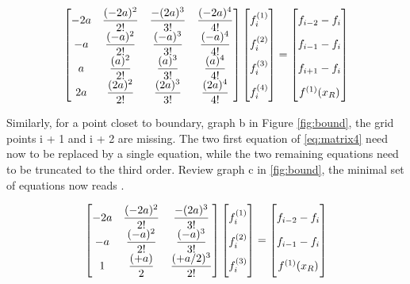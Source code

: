 \begin{align}
\begin{bmatrix} \label{eq:matrix4}
    -2a & \dfrac{(-2a)^2}{2!} & \dfrac{-(2a)^3}{3!} & \dfrac{(-2a)^4}{4!}\\
    -a & \dfrac{(-a)^2}{2!} & \dfrac{(-a)^3}{3!} & \dfrac{(-a)^4}{4!}\\
    a & \dfrac{(a)^2}{2!} & \dfrac{(a)^3}{3!} & \dfrac{(a)^4}{4!}\\
    2a & \dfrac{(2a)^2}{2!} & \dfrac{(2a)^3}{3!} & \dfrac{(2a)^4}{4!}
\end{bmatrix}
\begin{bmatrix}
    f_i^{(1)}  \vphantom{ \dfrac{d^4}{d} }\\
    f_i^{(2)}  \vphantom{ \dfrac{d^4}{d} } \\
    f_i^{(3)}  \vphantom{ \dfrac{d^4}{d} } \\
    f_i^{(4)}  \vphantom{ \dfrac{d^4}{d} }
\end{bmatrix}
=
\begin{bmatrix}
    f_{i-2} - f_{i}    \vphantom{ \dfrac{d^4}{d}} \\
    f_{i-1} - f_{i}    \vphantom{ \dfrac{d^4}{d}} \\
    f_{i+1} - f_{i}    \vphantom{ \dfrac{d^4}{d}} \\
    f^{(1)}(x_R)   \vphantom{ \dfrac{d^4}{d}}
\end{bmatrix}
\end{align}

Similarly, for a point closet to boundary, graph b in Figure \ref{fig:bound}, the grid points i + 1 and i + 2 are missing. The two first equation of \ref{eq:matrix4} need now to be replaced by a single equation, while the two remaining equations need to be truncated to the third order. Review graph c in \ref{fig:bound}, the minimal set of equations now reads \cite{methods}.

\begin{align} \label{eq:matrix3}
\begin{bmatrix}
    -2a & \dfrac{(-2a)^2}{2!} & \dfrac{-(2a)^3}{3!}\\
    -a & \dfrac{(-a)^2}{2!} & \dfrac{(-a)^3}{3!}\\
    1 & \dfrac{(+a)}{2} & \dfrac{(+a/2)^3}{2!}
\end{bmatrix}
\begin{bmatrix}
    f_i^{(1)}  \vphantom{ \dfrac{d^4}{d} }\\
    f_i^{(2)}  \vphantom{ \dfrac{d^4}{d} } \\
    f_i^{(3)}  \vphantom{ \dfrac{d^4}{d} }
\end{bmatrix}
=
\begin{bmatrix}
    f_{i-2} - f_{i}    \vphantom{ \dfrac{d^4}{d}} \\
    f_{i-1} - f_{i}    \vphantom{ \dfrac{d^4}{d}} \\
    f^{(1)}(x_R)   \vphantom{ \dfrac{d^4}{d}}
\end{bmatrix}
\end{align}

